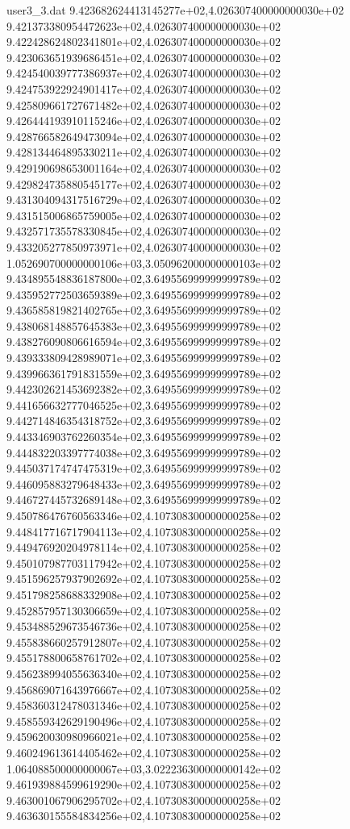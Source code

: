 \begin{filecontents}{user3_3.dat}
9.423682624413145277e+02,4.026307400000000030e+02
9.421373380954472623e+02,4.026307400000000030e+02
9.422428624802341801e+02,4.026307400000000030e+02
9.423063651939686451e+02,4.026307400000000030e+02
9.424540039777386937e+02,4.026307400000000030e+02
9.424753922924901417e+02,4.026307400000000030e+02
9.425809661727671482e+02,4.026307400000000030e+02
9.426444193910115246e+02,4.026307400000000030e+02
9.428766582649473094e+02,4.026307400000000030e+02
9.428134464895330211e+02,4.026307400000000030e+02
9.429190698653001164e+02,4.026307400000000030e+02
9.429824735880545177e+02,4.026307400000000030e+02
9.431304094317516729e+02,4.026307400000000030e+02
9.431515006865759005e+02,4.026307400000000030e+02
9.432571735578330845e+02,4.026307400000000030e+02
9.433205277850973971e+02,4.026307400000000030e+02
1.052690700000000106e+03,3.050962000000000103e+02
9.434895548836187800e+02,3.649556999999999789e+02
9.435952772503659389e+02,3.649556999999999789e+02
9.436585819821402765e+02,3.649556999999999789e+02
9.438068148857645383e+02,3.649556999999999789e+02
9.438276090806616594e+02,3.649556999999999789e+02
9.439333809428989071e+02,3.649556999999999789e+02
9.439966361791831559e+02,3.649556999999999789e+02
9.442302621453692382e+02,3.649556999999999789e+02
9.441656632777046525e+02,3.649556999999999789e+02
9.442714846354318752e+02,3.649556999999999789e+02
9.443346903762260354e+02,3.649556999999999789e+02
9.444832203397774038e+02,3.649556999999999789e+02
9.445037174747475319e+02,3.649556999999999789e+02
9.446095883279648433e+02,3.649556999999999789e+02
9.446727445732689148e+02,3.649556999999999789e+02
9.450786476760563346e+02,4.107308300000000258e+02
9.448417716717904113e+02,4.107308300000000258e+02
9.449476920204978114e+02,4.107308300000000258e+02
9.450107987703117942e+02,4.107308300000000258e+02
9.451596257937902692e+02,4.107308300000000258e+02
9.451798258688332908e+02,4.107308300000000258e+02
9.452857957130306659e+02,4.107308300000000258e+02
9.453488529673546736e+02,4.107308300000000258e+02
9.455838660257912807e+02,4.107308300000000258e+02
9.455178800658761702e+02,4.107308300000000258e+02
9.456238994055636340e+02,4.107308300000000258e+02
9.456869071643976667e+02,4.107308300000000258e+02
9.458360312478031346e+02,4.107308300000000258e+02
9.458559342629190496e+02,4.107308300000000258e+02
9.459620030980966021e+02,4.107308300000000258e+02
9.460249613614405462e+02,4.107308300000000258e+02
1.064088500000000067e+03,3.022236300000000142e+02
9.461939884599619290e+02,4.107308300000000258e+02
9.463001067906295702e+02,4.107308300000000258e+02
9.463630155584834256e+02,4.107308300000000258e+02

\end{filecontents}
